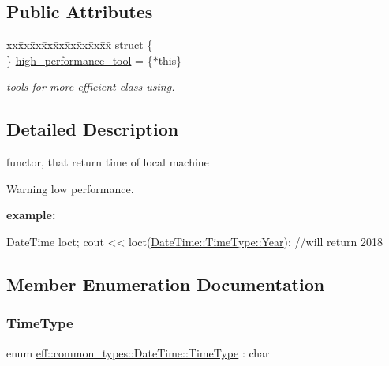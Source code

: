 \subsection*{Public Attributes}
\begin{DoxyCompactItemize}
\item 
\begin{tabbing}
xx\=xx\=xx\=xx\=xx\=xx\=xx\=xx\=xx\=\kill
struct \{\\
\} \hyperlink{classeff_1_1common__types_1_1DateTime_aadc332411e318afcc44e403161c17a85}{high\_performance\_tool} = \{$\ast$this\}\\

\end{tabbing}\begin{DoxyCompactList}\small\item\em tools for more efficient class using. \end{DoxyCompactList}\end{DoxyCompactItemize}


\subsection{Detailed Description}
functor, that return time of local machine 

\begin{DoxyWarning}{Warning}
low performance.
\end{DoxyWarning}
{\bfseries example\+:} 
\begin{DoxyCode}
DateTime loct;
cout << loct(\hyperlink{classeff_1_1common__types_1_1DateTime_a7c7c7290ee7be89bae66e68d24c68d09a537c66b24ef5c83b7382cdc3f34885f2}{DateTime::TimeType::Year}); \textcolor{comment}{//will return 2018}
\end{DoxyCode}
 

\subsection{Member Enumeration Documentation}
\mbox{\label{classeff_1_1common__types_1_1DateTime_a7c7c7290ee7be89bae66e68d24c68d09}} 
\subsubsection{\texorpdfstring{Time\+Type}{TimeType}}
{\footnotesize\ttfamily enum \hyperlink{classeff_1_1common__types_1_1DateTime_a7c7c7290ee7be89bae66e68d24c68d09}{eff\+::common\+\_\+types\+::\+Date\+Time\+::\+Time\+Type} \+: char\hspace{0.3cm}{\ttfamily [strong]}}



